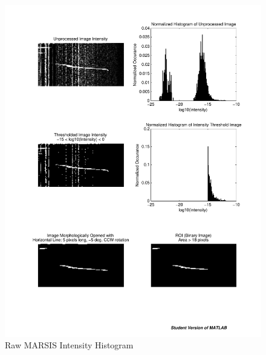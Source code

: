 \begin{figure}
\begin{minipage}[b]{0.5\linewidth}
		\includegraphics[trim=300 530 45 40,clip,width=1\linewidth]{gfx/SimpleThres}
		\caption{Raw MARSIS Intensity Histogram}\label{fig:rawHist}
	\end{minipage}
\end{figure}

